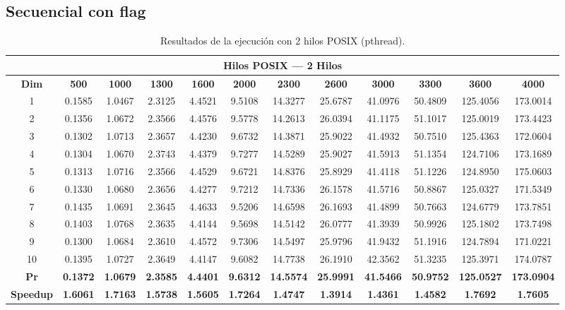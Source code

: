 \documentclass{article}
\begin{document}

\subsection{Secuencial con flag}

\begin{table}[H]
\centering
\tiny
\begin{tabular}{|c|c|c|c|c|c|c|c|c|c|c|c|}
\hline
\multicolumn{12}{|c|}{\textbf{Hilos POSIX --- 2 Hilos}} \\
\hline
\textbf{Dim} & \textbf{500} & \textbf{1000} & \textbf{1300} & \textbf{1600} & \textbf{2000} & \textbf{2300} & \textbf{2600} & \textbf{3000} & \textbf{3300} & \textbf{3600} & \textbf{4000} \\
\hline
1  & 0.1585 & 1.0467 & 2.3125 & 4.4521 & 9.5108 & 14.3277 & 25.6787 & 41.0976 & 50.4809 & 125.4056 & 173.0014 \\
2  & 0.1356 & 1.0672 & 2.3566 & 4.4576 & 9.5778 & 14.2613 & 26.0394 & 41.1175 & 51.1017 & 125.0019 & 173.4423 \\
3  & 0.1302 & 1.0713 & 2.3657 & 4.4230 & 9.6732 & 14.3871 & 25.9022 & 41.4932 & 50.7510 & 125.4363 & 172.0604 \\
4  & 0.1304 & 1.0670 & 2.3743 & 4.4379 & 9.7277 & 14.5289 & 25.9027 & 41.5913 & 51.1354 & 124.7106 & 173.1689 \\
5  & 0.1313 & 1.0716 & 2.3566 & 4.4529 & 9.6721 & 14.8376 & 25.8929 & 41.4118 & 51.1226 & 124.8950 & 175.0603 \\
6  & 0.1330 & 1.0680 & 2.3656 & 4.4277 & 9.7212 & 14.7336 & 26.1578 & 41.5716 & 50.8867 & 125.0327 & 171.5349 \\
7  & 0.1435 & 1.0691 & 2.3645 & 4.4633 & 9.5206 & 14.6598 & 26.1693 & 41.4899 & 50.7663 & 124.6779 & 173.7851 \\
8  & 0.1403 & 1.0768 & 2.3635 & 4.4144 & 9.5698 & 14.5142 & 26.0777 & 41.3939 & 50.9926 & 125.1802 & 173.7498 \\
9  & 0.1300 & 1.0684 & 2.3610 & 4.4572 & 9.7306 & 14.5497 & 25.9796 & 41.9432 & 51.1916 & 124.7894 & 171.0221 \\
10 & 0.1395 & 1.0727 & 2.3649 & 4.4147 & 9.6082 & 14.7738 & 26.1910 & 42.3562 & 51.3235 & 125.3971 & 174.0787 \\
\hline
\textbf{Pr} & \textbf{0.1372} & \textbf{1.0679} & \textbf{2.3585} & \textbf{4.4401} & \textbf{9.6312} & \textbf{14.5574} & \textbf{25.9991} & \textbf{41.5466} & \textbf{50.9752} & \textbf{125.0527} & \textbf{173.0904} \\
\hline
\textbf{Speedup} & \textbf{1.6061} & \textbf{1.7163} & \textbf{1.5738} & \textbf{1.5605} & \textbf{1.7264} & \textbf{1.4747} & \textbf{1.3914} & \textbf{1.4361} & \textbf{1.4582} & \textbf{1.7692} & \textbf{1.7605} \\
\hline
\end{tabular}
\label{tab:t2}
\caption{Resultados de la ejecución con 2 hilos POSIX (pthread).}
\end{table}
\end{document}

